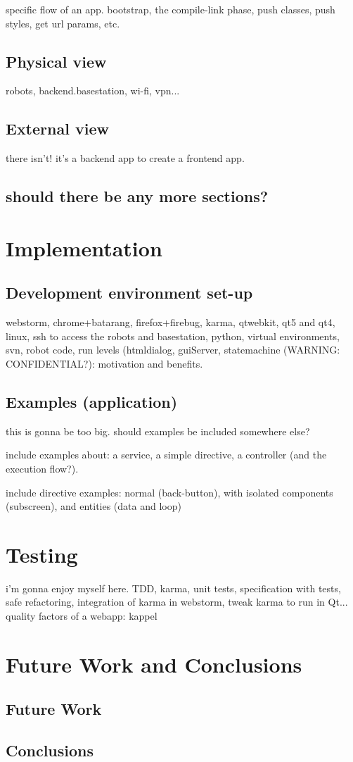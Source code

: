 specific flow of an app. bootstrap, the compile-link phase, push classes, push styles, get url params, etc.

\section{Physical view}
robots, backend.basestation, wi-fi, vpn...

\section{External view}
there isn't! it's a backend app to create a frontend app.

\section{should there be any more sections?}

\chapter{Implementation}

\section{Development environment set-up}
webstorm, chrome+batarang, firefox+firebug, karma, qtwebkit, qt5 and qt4, linux, ssh to access the robots and basestation, python, virtual environments, svn, robot code, run levels (htmldialog, guiServer, statemachine (WARNING: CONFIDENTIAL?): motivation and benefits.

\section{Examples (application)}
this is gonna be too big. should examples be included somewhere else?

include examples about: a service, a simple directive, a controller (and the execution flow?).

include directive examples: normal (back-button), with isolated components (subscreen), and entities (data and loop)

\chapter{Testing}
i'm gonna enjoy myself here.
TDD, karma, unit tests, specification with tests, safe refactoring, integration of karma in webstorm, tweak karma to run in Qt...
quality factors of a webapp: kappel


\chapter{Future Work and Conclusions}
\section{Future Work}
\section{Conclusions}